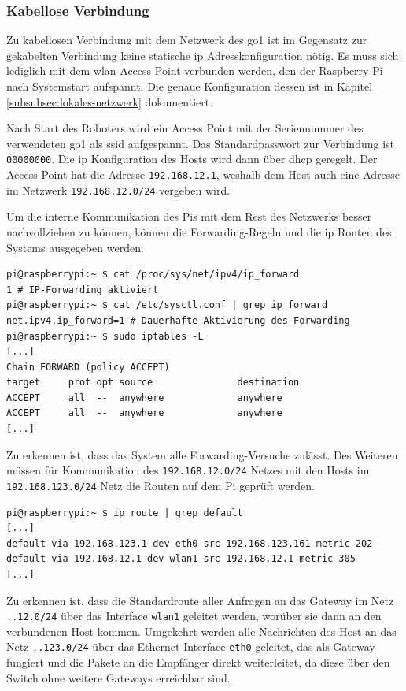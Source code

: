 \subsubsection{Kabellose Verbindung}

Zu kabellosen Verbindung mit dem Netzwerk des \gls{go1} ist im Gegensatz zur gekabelten Verbindung keine statische \gls{ip}
Adresskonfiguration nötig.
Es muss sich lediglich mit dem \gls{wlan} Access Point verbunden werden, den der Raspberry Pi nach Systemstart aufspannt.
Die genaue Konfiguration dessen ist in Kapitel \ref{subsubsec:lokales-netzwerk} dokumentiert.

Nach Start des Roboters wird ein Access Point mit der Seriennummer des verwendeten \gls{go1} als \gls{ssid} aufgespannt.
Das Standardpasswort zur Verbindung ist \texttt{00000000}.
Die \gls{ip} Konfiguration des Hosts wird dann über \gls{dhcp} geregelt.
Der Access Point hat die Adresse \texttt{192.168.12.1}, weshalb dem Host auch eine Adresse im Netzwerk
\texttt{192.168.12.0/24} vergeben wird.

Um die interne Kommunikation des Pis mit dem Rest des Netzwerks besser nachvollziehen zu können, können die Forwarding-Regeln
und die \gls{ip} Routen des Systems ausgegeben werden.

\begin{lstlisting}
pi@raspberrypi:~ $ cat /proc/sys/net/ipv4/ip_forward
1 # IP-Forwarding aktiviert
pi@raspberrypi:~ $ cat /etc/sysctl.conf | grep ip_forward
net.ipv4.ip_forward=1 # Dauerhafte Aktivierung des Forwarding
pi@raspberrypi:~ $ sudo iptables -L
[...]
Chain FORWARD (policy ACCEPT)
target     prot opt source               destination
ACCEPT     all  --  anywhere             anywhere
ACCEPT     all  --  anywhere             anywhere
[...]
\end{lstlisting}

\noindent Zu erkennen ist, dass das System alle Forwarding-Versuche zulässt.
Des Weiteren müssen für Kommunikation des \texttt{192.168.12.0/24} Netzes mit den Hosts im \texttt{192.168.123.0/24} Netz
die Routen auf dem Pi geprüft werden.

\begin{lstlisting}
pi@raspberrypi:~ $ ip route | grep default
[...]
default via 192.168.123.1 dev eth0 src 192.168.123.161 metric 202
default via 192.168.12.1 dev wlan1 src 192.168.12.1 metric 305
[...]
\end{lstlisting}

\noindent Zu erkennen ist, dass die Standardroute aller Anfragen an das Gateway im Netz \texttt{..12.0/24} über das
Interface \texttt{wlan1} geleitet werden, worüber sie dann an den verbundenen Host kommen.
Umgekehrt werden alle Nachrichten des Host an das Netz \texttt{..123.0/24} über das Ethernet Interface \texttt{eth0}
geleitet, das als Gateway fungiert und die Pakete an die Empfänger direkt weiterleitet, da diese über den Switch ohne
weitere Gateways erreichbar sind.

